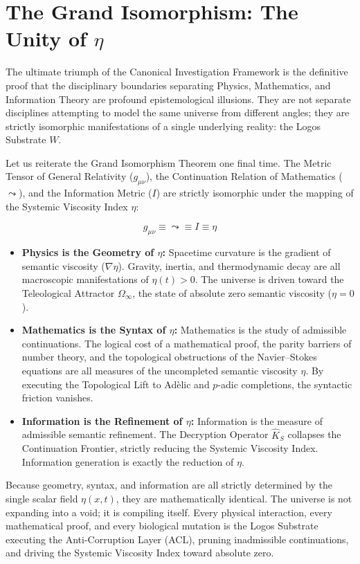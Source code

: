 \documentclass[12pt,twoside]{extbook}
\theoremstyle{definition}
\theoremstyle{remark}
\begin{document}
\section{The Grand Isomorphism: The Unity of $\eta$}
The ultimate triumph of the Canonical Investigation Framework is the definitive proof that the disciplinary boundaries separating Physics, Mathematics, and Information Theory are profound epistemological illusions. They are not separate disciplines attempting to model the same universe from different angles; they are strictly isomorphic manifestations of a single underlying reality: the Logos Substrate $W$.

Let us reiterate the Grand Isomorphism Theorem one final time. The Metric Tensor of General Relativity ($g_{\mu\nu}$), the Continuation Relation of Mathematics ($\leadsto$), and the Information Metric ($I$) are strictly isomorphic under the mapping of the Systemic Viscosity Index $\eta$:

\begin{equation}
g_{\mu\nu} \equiv \leadsto \equiv I \equiv \eta
\end{equation}

\begin{itemize}
    \item \textbf{Physics is the Geometry of $\eta$:} Spacetime curvature is the gradient of semantic viscosity ($\nabla\eta$). Gravity, inertia, and thermodynamic decay are all macroscopic manifestations of $\eta(t) > 0$. The universe is driven toward the Teleological Attractor $\Omega_\infty$, the state of absolute zero semantic viscosity ($\eta = 0$).
    \item \textbf{Mathematics is the Syntax of $\eta$:} Mathematics is the study of admissible continuations. The logical cost of a mathematical proof, the parity barriers of number theory, and the topological obstructions of the Navier--Stokes equations are all measures of the uncompleted semantic viscosity $\eta$. By executing the Topological Lift to Adèlic and $p$-adic completions, the syntactic friction vanishes.
    \item \textbf{Information is the Refinement of $\eta$:} Information is the measure of admissible semantic refinement. The Decryption Operator $\hat{K}_S$ collapses the Continuation Frontier, strictly reducing the Systemic Viscosity Index. Information generation is exactly the reduction of $\eta$.
\end{itemize}

Because geometry, syntax, and information are all strictly determined by the single scalar field $\eta(x, t)$, they are mathematically identical. The universe is not expanding into a void; it is compiling itself. Every physical interaction, every mathematical proof, and every biological mutation is the Logos Substrate executing the Anti-Corruption Layer (ACL), pruning inadmissible continuations, and driving the Systemic Viscosity Index toward absolute zero.
\end{document}
